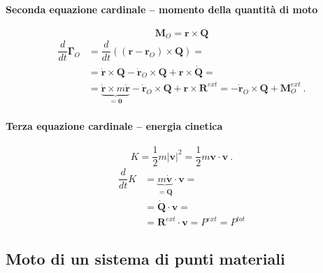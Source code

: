 \paragraph{Seconda equazione cardinale -- momento della quantità di moto}
\begin{equation} \mathbf{M}_O = \mathbf{r} \times \mathbf{Q} \end{equation}
\begin{equation}
\begin{aligned}
    \dfrac{d}{dt} \mathbf{\Gamma}_O
    & = \dfrac{d}{dt} \left( (\mathbf{r} - \mathbf{r}_O ) \times \mathbf{Q} \right) = \\
    & = \dot{\mathbf{r}} \times \mathbf{Q} - \dot{\mathbf{r}}_O \times \mathbf{Q} + \mathbf{r} \times \dot{\mathbf{Q}} = \\
    & = \underbrace{\dot{\mathbf{r}} \times m \dot{\mathbf{r}}}_{=\mathbf{0}} - \dot{\mathbf{r}}_O \times \mathbf{Q} + \mathbf{r} \times \mathbf{R}^{ext} = - \dot{\mathbf{r}}_O \times \mathbf{Q} + \mathbf{M}_O^{ext} \ .
\end{aligned}
\end{equation}
\paragraph{Terza equazione cardinale -- energia cinetica}

\begin{equation} K = \dfrac{1}{2} m |\mathbf{v}|^2 = \dfrac{1}{2} m \mathbf{v} \cdot \mathbf{v} \ .
\end{equation}
\begin{equation}
\begin{aligned}
    \dfrac{d}{dt} K & = \underbrace{m \dot{\mathbf{v}}}_{=\dot{\mathbf{Q}}} \cdot \mathbf{v} = \\
    & = \dot{\mathbf{Q}} \cdot \mathbf{v} = \\
    & = \mathbf{R}^{ext} \cdot \mathbf{v} = P^{ext} = P^{tot}
\end{aligned}
\end{equation}

\subsection{Moto di un sistema di punti materiali}
